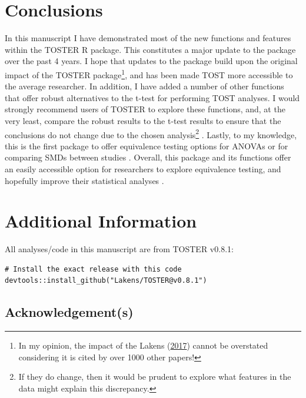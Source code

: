 \documentclass[
]{interact}
\begin{document}
\newpage

\hypertarget{conclusions}{%
\section{Conclusions}\label{conclusions}}

In this manuscript I have demonstrated most of the new functions and
features within the TOSTER R package. This constitutes a major update to
the package over the past 4 years. I hope that updates to the package
build upon the original impact of the TOSTER package\footnote{In my
  opinion, the impact of the Lakens
  (\protect\hyperlink{ref-lakens_ori}{2017}) cannot be overstated
  considering it is cited by over 1000 other papers!}, and has been made
TOST more accessible to the average researcher. In addition, I have
added a number of other functions that offer robust alternatives to the
t-test for performing TOST analyses. I would strongly recommend users of
TOSTER to explore these functions, and, at the very least, compare the
robust results to the t-test results to ensure that the conclusions do
not change due to the chosen analysis\footnote{If they do change, then
  it would be prudent to explore what features in the data might explain
  this discrepancy.} . Lastly, to my knowledge, this is the first
package to offer equivalence testing options for ANOVAs or for comparing
SMDs between studies . Overall, this package and its functions offer an
easily accessible option for researchers to explore equivalence testing,
and hopefully improve their statistical analyses .

\newpage

\hypertarget{additional-information}{%
\section{Additional Information}\label{additional-information}}

All analyses/code in this manuscript are from TOSTER v0.8.1:

\begin{verbatim}
# Install the exact release with this code
devtools::install_github("Lakens/TOSTER@v0.8.1")
\end{verbatim}

\hypertarget{acknowledgements}{%
\subsection*{Acknowledgement(s)}\label{acknowledgements}}
\end{document}
